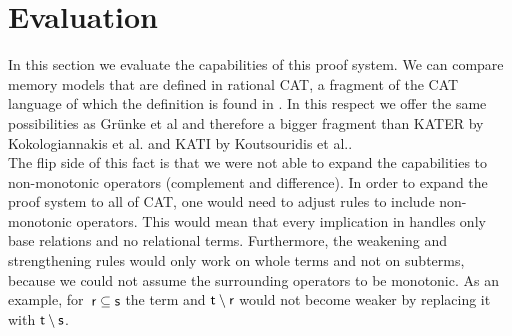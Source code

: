 \documentclass[a4paper,twoside,12pt, english]{article}
\begin{document}
\section{Evaluation}\label{sec:evaluation}
In this section we evaluate the capabilities of this proof system. We can compare memory models that are defined in rational CAT, a fragment of the CAT language of which the definition is found in . In this respect we offer the same possibilities as Grünke et al and therefore a bigger fragment than KATER \cite{Kok+23} by Kokologiannakis et al. and KATI \cite{Kou+24} by Koutsouridis et al..\\
The flip side of this fact is that we were not able to expand the capabilities to non-monotonic operators (complement and difference). In order to expand the proof system to all of CAT, one would need to adjust rules to include non-monotonic operators. This would mean that every implication in  handles only base relations and no relational terms. Furthermore, the weakening and strengthening rules would only work on whole terms and not on subterms, because we could not assume the surrounding operators to be monotonic. As an example, for~$\textsf{\upshape r} \subseteq \textsf{\upshape s}$ the term and $\textsf{\upshape t}\setminus \textsf{\upshape r}$ would not become weaker by replacing it with $\textsf{\upshape t} \setminus \textsf{\upshape s}$.
\end{document}

